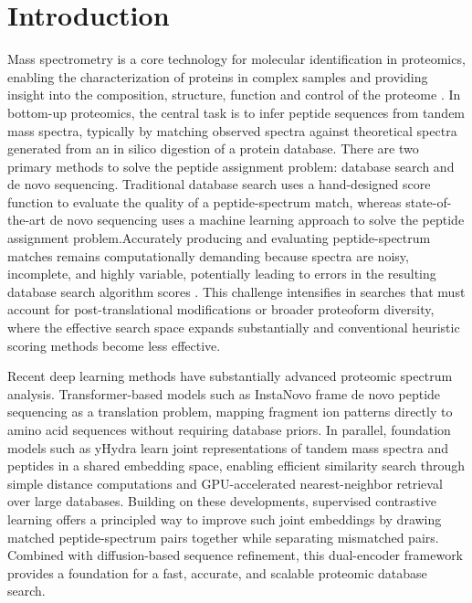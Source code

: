 \documentclass[pdflatex,sn-mathphys-num]{sn-jnl}%
\theoremstyle{thmstyleone}%
\theoremstyle{thmstyletwo}%
\theoremstyle{thmstylethree}%
\begin{document}
\section{Introduction}\label{sec1}
Mass spectrometry is a core technology for molecular identification in proteomics, enabling the characterization of proteins in complex samples and providing insight into the composition, structure, function and control of the proteome \cite{aebersold2016mass}. In bottom-up proteomics, the central task is to infer peptide sequences from tandem mass spectra, typically by matching observed spectra against theoretical spectra generated from an in silico digestion of a protein database. There are two primary methods to solve the peptide assignment problem: database search and de novo sequencing. Traditional database search uses a hand-designed score function to evaluate the quality of a peptide-spectrum match, whereas state-of-the-art de novo sequencing uses a machine learning approach to solve the peptide assignment problem.Accurately producing and evaluating peptide-spectrum matches remains computationally demanding because spectra are noisy, incomplete, and highly variable, potentially leading to errors in the resulting database search algorithm scores \citep{venable2004impact}. This challenge intensifies in searches that must account for post-translational modifications or broader proteoform diversity, where the effective search space expands substantially and conventional heuristic scoring methods become less effective.

\noindent Recent deep learning methods have substantially advanced proteomic spectrum analysis. Transformer-based models such as InstaNovo frame de novo peptide sequencing as a translation problem, mapping fragment ion patterns directly to amino acid sequences without requiring database priors. In parallel, foundation models such as yHydra learn joint representations of tandem mass spectra and peptides in a shared embedding space, enabling efficient similarity search through simple distance computations and GPU-accelerated nearest-neighbor retrieval over large databases. Building on these developments, supervised contrastive learning offers a principled way to improve such joint embeddings by drawing matched peptide-spectrum pairs together while separating mismatched pairs. Combined with diffusion-based sequence refinement, this dual-encoder framework provides a foundation for a fast, accurate, and scalable proteomic database search.
\end{document}
